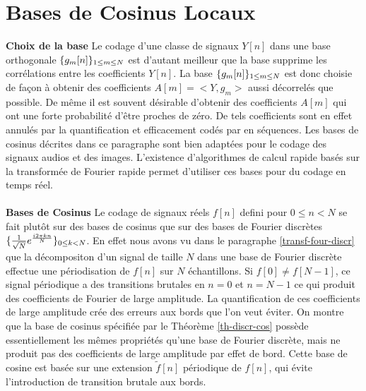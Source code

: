 \section{Bases de Cosinus Locaux}

{\bf Choix de la base}
Le codage d'une classe de signaux $Y[n]$ dans une base
orthogonale $\{g_m [n]\}_{ 1 \leq m \leq N}$ est d'autant meilleur que la base
supprime les corr\'elations entre les coefficients $Y[n]$.
La base $\{g_m [n]\}_{ 1 \leq m \leq N}$ est donc choisie de fa\c con \`a obtenir des
coefficients $A[m] = <Y,g_m>$ aussi d\'ecorrel\'es que possible.
De m\^eme il est souvent d\'esirable d'obtenir des coefficients
$A[m]$ qui ont une forte probabilit\'e d'\^etre proches de z\'ero.
De tels coefficients sont en effet annul\'es par la quantification
et efficacement cod\'es par en s\'equences.
Les bases de cosinus d\'ecrites dans ce paragraphe sont bien
adapt\'ees pour le codage des signaux audios et des images.
L'existence d'algorithmes de calcul rapide bas\'es sur la transform\'ee
de Fourier rapide permet d'utiliser ces bases pour du codage
en temps r\'eel.
\\
\\
{\bf Bases de Cosinus}
Le codage de signaux r\'eels
$f[n]$ defini pour $0 \leq n < N$
se fait plut\^ot sur des bases de
cosinus que sur des bases de Fourier discr\`etes
$\{\frac 1 {\sqrt N} e ^{\frac {i2 \pi k n} N } \}_{ 0 \leq k < N}$.
En effet nous avons vu dans le paragraphe \ref{transf-four-discr}
que la d\'ecompositon d'un signal de taille $N$ dans une base
de Fourier discr\`ete effectue une p\'eriodisation de $f[n]$ sur
$N$ \'echantillons. Si $f[0] \neq f[N-1]$, ce signal p\'eriodique
a des transitions brutales en $n=0$ et $n=N-1$ ce qui produit des
coefficients de Fourier de large amplitude. La quantification
de ces coefficients de large amplitude cr\'ee des erreurs aux
bords que l'on veut \'eviter.
On montre que la base
de cosinus sp\'ecifi\'ee par le Th\'eor\`eme
\ref{th-discr-cos} poss\`ede essentiellement
les m\^emes propri\'et\'es
qu'une base de Fourier discr\`ete, mais ne
produit
pas des coefficients de large amplitude par effet de bord.
Cette base de cosine est bas\'ee sur une extension $\tilde f [n]$
p\'eriodique de $f[n]$,
qui \'evite l'introduction de transition brutale aux bords.

